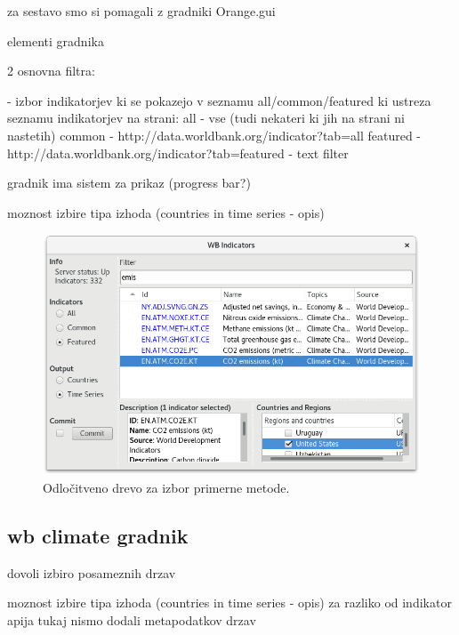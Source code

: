 za sestavo smo si pomagali z gradniki Orange.gui 

elementi gradnika

2 osnovna filtra: 

- izbor indikatorjev ki se pokazejo v seznamu all/common/featured 
  ki ustreza seznamu indikatorjev na strani: 
  all - vse (tudi nekateri ki jih na strani ni nastetih)
  common - http://data.worldbank.org/indicator?tab=all
  featured - http://data.worldbank.org/indicator?tab=featured
- text filter

gradnik ima sistem za prikaz (progress bar?) 

moznost izbire tipa izhoda (countries in time series - opis)

\begin{figure}
\begin{center}
\includegraphics[width=12cm]{pic/co2_temp_indicator_selection.png}
\end{center}
\caption{Odločitveno drevo za izbor primerne metode.}
\label{co2_temp_indicator}
\end{figure} 



\subsection{wb climate gradnik}

dovoli izbiro posameznih drzav 

moznost izbire tipa izhoda (countries in time series - opis)
za razliko od indikator apija tukaj nismo dodali metapodatkov drzav 



